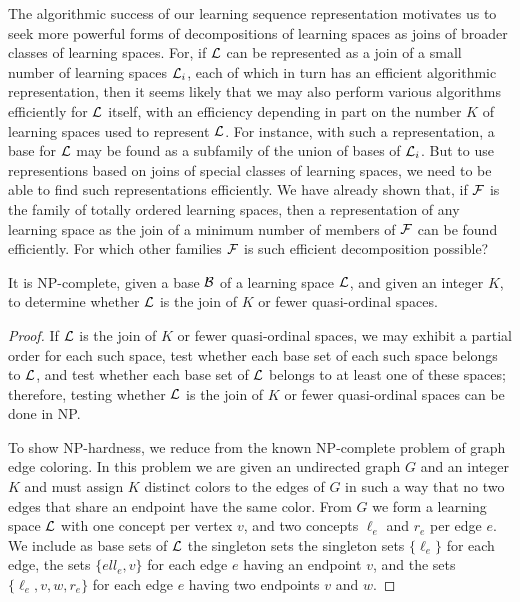 \documentclass[11pt]{llncs}
\begin{document}
{The algorithmic success of our learning sequence representation motivates us to seek more powerful forms of decompositions of learning spaces as joins of broader classes of learning spaces.
For, if $\cal L$ can be represented as a join of a small number of learning spaces ${\cal L}_i$, each of which in turn has an efficient algorithmic representation, then it seems likely that we may also perform
various algorithms efficiently for $\cal L$ itself, with an efficiency depending in part on the number $K$ of learning spaces used to represent $\cal L$. For instance, with such a representation, a base for $\cal L$ may be found as a subfamily of the union of bases of ${\cal L}_i$. But to use representions based on joins of special classes of learning spaces, we need to be able to find such representations efficiently. We have already shown that, if $\cal F$ is the family of totally ordered learning spaces, then a representation of any learning space as the join of a minimum number of members of $\cal F$ can be found efficiently. For which other families $\cal F$ is such efficient decomposition possible?

\begin{theorem}
It is NP-complete, given a base $\cal B$ of a learning space $\cal L$, and given an integer $K$, to determine whether $\cal L$ is the join of $K$ or fewer quasi-ordinal spaces.
\end{theorem}

\begin{proof}
If $\cal L$ is the join of $K$ or fewer quasi-ordinal spaces, we may exhibit a partial order for each such space, test whether each base set of each such space belongs to $\cal L$, and test whether each base set of $\cal L$ belongs to at least one of these spaces; therefore, testing whether  $\cal L$ is the join of $K$ or fewer quasi-ordinal spaces can be done in NP.

To show NP-hardness, we reduce from the known NP-complete problem of graph edge coloring.
In this problem we are given an undirected graph $G$ and an integer $K$ and must assign $K$ distinct colors to the edges of $G$ in such a way that no two edges that share an endpoint have the same color.
From $G$ we form a learning space $\cal L$ with one concept per vertex $v$, and two concepts $\ell_e$ and $r_e$ per edge $e$. We include as base sets of $\cal L$ the singleton sets the singleton sets $\{\ell_e\}$ for each edge, the sets $\{ell_e,v\}$ for each edge $e$ having an endpoint $v$, and the sets $\{\ell_e,v,w,r_e\}$ for each edge $e$ having two endpoints $v$ and $w$.


\end{proof}}
\end{document}
